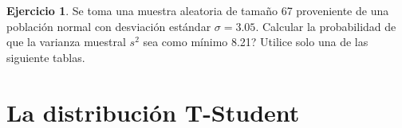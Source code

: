 \documentclass[
  11pt,
]{book}
\theoremstyle{definition}
\theoremstyle{definition}
\theoremstyle{definition}
\newtheorem{exercise}{Ejercicio}[chapter]
\theoremstyle{definition}
\theoremstyle{remark}
\begin{document}
\begin{exercise}

Se toma una muestra aleatoria de tamaño 67 proveniente de una población normal con desviación estándar \(\sigma =3.05\). Calcular la probabilidad de que la varianza muestral \(s^{2}\) sea como mínimo 8.21? Utilice solo una de las siguiente tablas.

\begin{minipage}{.45\textwidth} \centering \begin{table}[H]
\centering
\caption{\label{tab:unnamed-chunk-66}Distribución Ji-Cuadrado, df = 66}
\centering
{}
\end{table} \end{minipage}
      \begin{minipage}{.45\textwidth} \centering \begin{table}[H]
\centering
\caption{\label{tab:unnamed-chunk-67}Distribución Ji-Cuadrado, df = 65}
\centering
{}
\end{table} \end{minipage}

\end{exercise}

\section{La distribución T-Student}\label{la-distribuciuxf3n-t-student}
\end{document}
